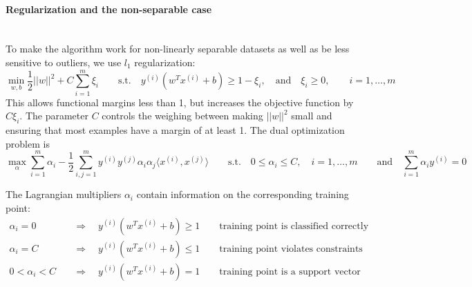     \paragraph{Regularization and the non-separable case}~\\
    To make the algorithm work for non-linearly separable datasets as well as be less sensitive to outliers, we use $l_1$ regularization:
    \begin{equation*}
        \min_{w,b} \frac{1}{2}||w||^2 + C \sum\limits_{i=1}^m \xi_i
        \qquad \text{s.t.} \quad
        y^{(i)}(w^T x^{(i)} + b) \geq 1-\xi_i,
        \quad \text{and} \quad
        \xi_i \geq 0,
        \qquad i=1,\ldots,m
    \end{equation*}
    This allows functional margins less than 1, but increases the objective function by $C\xi_i$.
    The parameter $C$ controls the weighing between making $||w||^2$ small and ensuring that most examples have a margin of at least 1.
    The dual optimization problem is
    \begin{equation*}
        \max_{\alpha} \sum\limits_{i=1}^m \alpha_i - \frac{1}{2}\sum\limits_{i,j=1}^m y^{(i)} y^{(j)} \alpha_i \alpha_j \langle x^{(i)},x^{(j)} \rangle
        \qquad \text{s.t.} \quad
        0 \leq \alpha_i \leq C, \quad i=1,\ldots,m
        \qquad \text{and} \quad
        \sum\limits_{i=1}^m \alpha_i y^{(i)}=0
    \end{equation*}
    
    The Lagrangian multipliers $\alpha_i$ contain information on the corresponding training point:
    \begin{align*}
        \alpha_i = 0 & \quad\Rightarrow\quad y^{(i)}(w^T x^{(i)}+b) \geq 1 \qquad \text{training point is classified correctly}\\
        \alpha_i = C & \quad\Rightarrow\quad y^{(i)}(w^T x^{(i)}+b) \leq 1 \qquad \text{training point violates constraints}\\
        0 < \alpha_i < C & \quad\Rightarrow\quad y^{(i)}(w^T x^{(i)}+b) = 1 \qquad \text{training point is a support vector}\\
    \end{align*}
 	
 	
